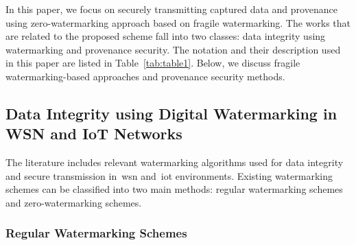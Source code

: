 \documentclass{llncs}
\begin{document}
In this paper, we focus on securely transmitting captured data and provenance using zero-watermarking approach based on fragile watermarking. The works that are related to the proposed scheme fall into two classes: data integrity using watermarking and provenance security. The notation and their description used in this paper are listed in Table~\ref{tab:table1}. Below, we discuss fragile watermarking-based approaches and provenance security methods. 



\subsection{Data Integrity using Digital Watermarking in WSN and IoT Networks}

The literature includes relevant watermarking algorithms used for data integrity and secure transmission in~\gls*{wsn} and~\gls*{iot} environments. Existing watermarking schemes can be classified into two main methods: regular watermarking schemes and zero-watermarking schemes. 

\subsubsection{Regular Watermarking Schemes} 
\end{document}
